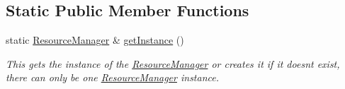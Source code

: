 \subsection*{Static Public Member Functions}
\begin{DoxyCompactItemize}
\item 
\mbox{\label{class_resource_manager_a8fd3155e6658c0bdc3b3f6f81443e374}} 
static \mbox{\hyperlink{class_resource_manager}{Resource\+Manager}} \& \mbox{\hyperlink{class_resource_manager_a8fd3155e6658c0bdc3b3f6f81443e374}{get\+Instance}} ()
\begin{DoxyCompactList}\small\item\em This gets the instance of the \mbox{\hyperlink{class_resource_manager}{Resource\+Manager}} or creates it if it doesn\textquotesingle{}t exist, there can only be one \mbox{\hyperlink{class_resource_manager}{Resource\+Manager}} instance. \end{DoxyCompactList}\end{DoxyCompactItemize}
